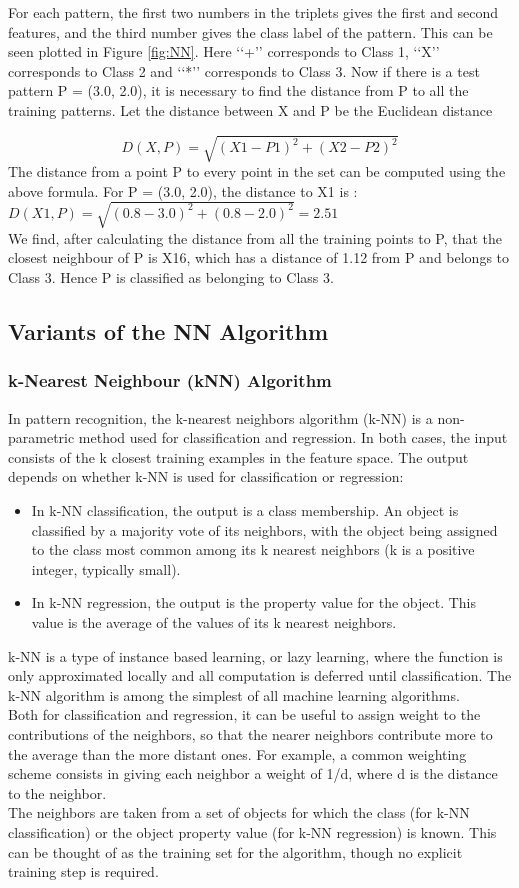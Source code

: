 For each pattern, the first two numbers in the triplets gives the first and second
features, and the third number gives the class label of the pattern.
This can be seen plotted in Figure \ref{fig:NN}. Here ‘‘+’’ corresponds to Class 1, ‘‘X’’
corresponds to Class 2 and ‘‘*’’ corresponds to Class 3.
Now if there is a test pattern P = (3.0, 2.0), it is necessary to find the distance
from P to all the training patterns.
Let the distance between X and P be the Euclidean distance

$$D(X,P) = \sqrt{(X1 - P1)^{2} + (X2 - P2 )^{2} }$$
\newline
The distance from a point P to every point in the set can be computed using the above formula. For P = (3.0, 2.0), the distance to X1 is :
$D(X1,P) = \sqrt{(0.8 - 3.0)^{2} + (0.8 - 2.0 )^{2} } = 2.51 $ \\
We find, after calculating the distance from all the training points to P, that the closest
neighbour of P is X16, which has a distance of 1.12 from P and belongs to Class 3.
Hence P is classified as belonging to Class 3.
\subsection{Variants of the NN Algorithm}
\subsubsection{k-Nearest Neighbour (kNN) Algorithm}
In pattern recognition, the k-nearest neighbors algorithm (k-NN) is a non-parametric method used for classification and regression.  In both cases, the input consists of the k closest training examples in the feature space. The output depends on whether k-NN is used for classification or regression:
\begin{itemize}
\item In k-NN classification, the output is a class membership. An object is classified by a majority vote of its neighbors, with the object being assigned to the class most common among its k nearest neighbors (k is a positive integer, typically small). 
\item In k-NN regression, the output is the property value for the object. This value is the average of the values of its k nearest neighbors.
\end{itemize}

k-NN is a type of instance based learning, or lazy learning, where the function is only approximated locally and all computation is deferred until classification. The k-NN algorithm is among the simplest of all machine learning algorithms.\\ Both for classification and regression, it can be useful to assign weight to the contributions of the neighbors, so that the nearer neighbors contribute more to the average than the more distant ones. For example, a common weighting scheme consists in giving each neighbor a weight of 1/d, where d is the distance to the neighbor.\\ The neighbors are taken from a set of objects for which the class (for k-NN classification) or the object property value (for k-NN regression) is known. This can be thought of as the training set for the algorithm, though no explicit training step is required.

